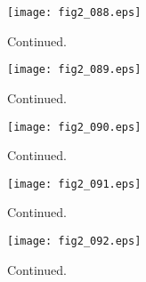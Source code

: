 \documentclass[preprint]{aastex}
\begin{document}
\setcounter{figure}{1}
\begin{figure}[t]
\centering
\texttt{[image: fig2\_088.eps]}
\caption{
Continued. 
}
\label{Fig2}
\end{figure}
\clearpage



\setcounter{figure}{1}
\begin{figure}[t]
\centering
\texttt{[image: fig2\_089.eps]}
\caption{
Continued. 
}
\label{Fig2}
\end{figure}
\clearpage



\setcounter{figure}{1}
\begin{figure}[t]
\centering
\texttt{[image: fig2\_090.eps]}
\caption{
Continued. 
}
\label{Fig2}
\end{figure}
\clearpage



\setcounter{figure}{1}
\begin{figure}[t]
\centering
\texttt{[image: fig2\_091.eps]}
\caption{
Continued. 
}
\label{Fig2}
\end{figure}
\clearpage



\setcounter{figure}{1}
\begin{figure}[t]
\centering
\texttt{[image: fig2\_092.eps]}
\caption{
Continued. 
}
\label{Fig2}
\end{figure}
\clearpage
\end{document}
